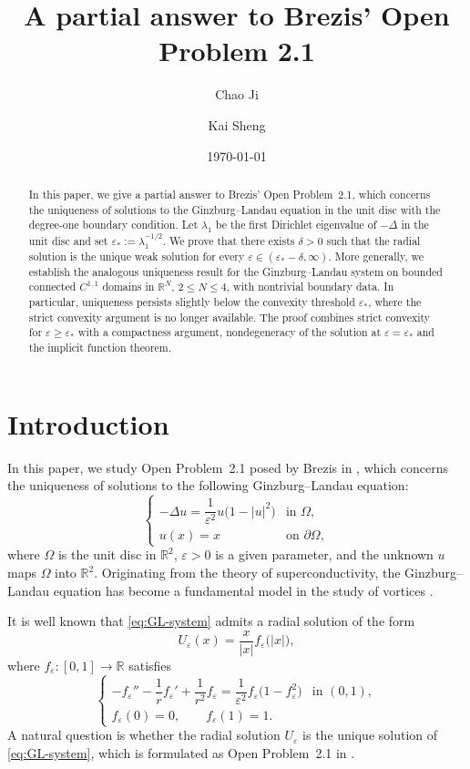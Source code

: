 \documentclass[11pt]{amsart}
\title[A Partial Answer to Brezis' Open Problem 2.1]
{A partial answer to Brezis' Open Problem 2.1}
\author[C. Ji]{Chao Ji}
\author[K. Sheng]{Kai Sheng}
\date{\today}
\theoremstyle{definition}
\theoremstyle{plain}
\newcommand{\abs}[1]{\lvert#1\rvert}
\newcommand{\R}{\mathbb{R}}
\numberwithin{equation}{section}
\begin{document}
\begin{abstract}
In this paper, we give a partial answer to Brezis' Open Problem~2.1, which concerns the uniqueness of solutions to the Ginzburg--Landau equation in the unit disc with the degree-one boundary condition. Let $\lambda_1$ be the first Dirichlet eigenvalue of $-\Delta$ in the unit disc and set $\varepsilon_*:=\lambda_1^{-1/2}$. We prove that there exists $\delta>0$ such that the radial solution is the unique weak solution for every $\varepsilon\in(\varepsilon_*-\delta,\infty)$. More generally, we establish the analogous uniqueness result for the Ginzburg--Landau system on bounded connected $C^{1,1}$ domains in $\mathbb R^N$, $2\leq N\leq4$, with nontrivial boundary data. In particular, uniqueness persists slightly below the convexity threshold $\varepsilon_*$, where the strict convexity argument is no longer available. The proof combines strict convexity for $\varepsilon\geq\varepsilon_*$ with a compactness argument, nondegeneracy of the solution at $\varepsilon=\varepsilon_*$ and the implicit function theorem. 
\end{abstract}

\maketitle

\section{Introduction}	
In this paper, we study Open Problem~2.1 posed by Brezis in \cite{Brezis2023}, which concerns the uniqueness of solutions to the following Ginzburg--Landau equation:
\begin{equation}\label{eq:GL-system}
	\begin{cases}
		-\Delta u
		=
		\dfrac{1}{\varepsilon^2}u\bigl(1-\abs{u}^2\bigr)
		& \text{in } \Omega,\\[2mm]
		u(x)=x
		& \text{on } \partial\Omega,
	\end{cases}
\end{equation}
where $\Omega$ is the unit disc in $\mathbb R^2$, $\varepsilon>0$ is a given parameter, and the unknown $u$ maps $\Omega$ into $\mathbb R^2$. Originating from the theory of superconductivity, the Ginzburg--Landau equation has become a fundamental model in the study of vortices \cite{GinzburgLandau1950,deGennes1966}.

It is well known that \eqref{eq:GL-system} admits a radial solution of the form
\[	U_\varepsilon(x)
=
\frac{x}{\abs{x}}f_\varepsilon\bigl(\abs{x}\bigr),\]
where $f_\varepsilon\colon[0,1]\to\R$ satisfies
\[	\begin{cases}
	-f_\varepsilon''
	-\dfrac{1}{r}f_\varepsilon'
	+\dfrac{1}{r^2}f_\varepsilon
	=
	\dfrac{1}{\varepsilon^2}
	f_\varepsilon\bigl(1-f_\varepsilon^2\bigr)
	& \text{in }(0,1),\\[2mm]
	f_\varepsilon(0)=0,
	\qquad
	f_\varepsilon(1)=1.
\end{cases}\]
A natural question is whether the radial solution $U_\varepsilon$ is the unique solution of \eqref{eq:GL-system}, which is formulated as Open Problem~2.1 in \cite{Brezis2023}.
\end{document}
